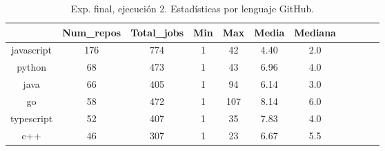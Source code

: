 \begin{table}[h]
  \centering
  \caption{Exp. final, ejecución 2. Estadísticas por lenguaje GitHub.}
  \label{tab:tabla_f2_4}

\begin{footnotesize}
\renewcommand{\arraystretch}{1.5} %
\begin{tabular}{ccccccccccc}
  \hline
  {} &  Num\_repos &  Total\_jobs &  Min &  Max &  Media &  Mediana \\
  \hline
  javascript    &        176 &         774 &    1 &   42 &    4.40 &      2.0 \\
  python        &         68 &         473 &    1 &   43 &    6.96 &      4.0 \\
  java          &         66 &         405 &    1 &   94 &    6.14 &      3.0 \\
  go            &         58 &         472 &    1 &  107 &    8.14 &      6.0 \\
  typescript    &         52 &         407 &    1 &   35 &    7.83 &      4.0 \\
  c++           &         46 &         307 &    1 &   23 &    6.67 &      5.5 \\

\end{tabular}
\end{footnotesize}
\end{table}
